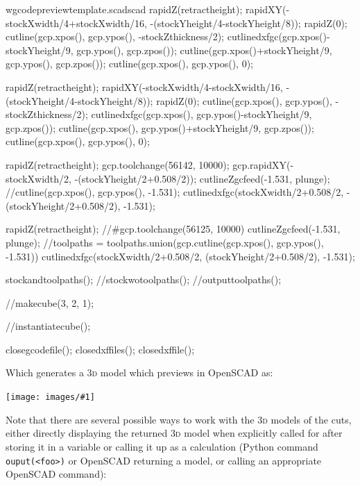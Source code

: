 \documentclass{ltxdoc}
\newcommand{\includeimage}[1]{\bigskip\noindent\texttt{[image: images/\#1]}\bigskip}
\begin{document}
\begin{writecode}{w}{gcodepreviewtemplate.scad}{scad}
rapidZ(retractheight);
rapidXY(-stockXwidth/4+stockXwidth/16, -(stockYheight/4-stockYheight/8));
rapidZ(0);
cutline(gcp.xpos(), gcp.ypos(), -stockZthickness/2);
cutlinedxfgc(gcp.xpos()-stockYheight/9, gcp.ypos(), gcp.zpos());
cutline(gcp.xpos()+stockYheight/9, gcp.ypos(), gcp.zpos());
cutline(gcp.xpos(), gcp.ypos(), 0);

rapidZ(retractheight);
rapidXY(-stockXwidth/4-stockXwidth/16, -(stockYheight/4-stockYheight/8));
rapidZ(0);
cutline(gcp.xpos(), gcp.ypos(), -stockZthickness/2);
cutlinedxfgc(gcp.xpos(), gcp.ypos()-stockYheight/9, gcp.zpos());
cutline(gcp.xpos(), gcp.ypos()+stockYheight/9, gcp.zpos());
cutline(gcp.xpos(), gcp.ypos(), 0);



rapidZ(retractheight);
gcp.toolchange(56142, 10000);
gcp.rapidXY(-stockXwidth/2, -(stockYheight/2+0.508/2));
cutlineZgcfeed(-1.531, plunge);
//cutline(gcp.xpos(), gcp.ypos(), -1.531);
cutlinedxfgc(stockXwidth/2+0.508/2, -(stockYheight/2+0.508/2), -1.531);

rapidZ(retractheight);
//#gcp.toolchange(56125, 10000)
cutlineZgcfeed(-1.531, plunge);
//toolpaths = toolpaths.union(gcp.cutline(gcp.xpos(), gcp.ypos(), -1.531))
cutlinedxfgc(stockXwidth/2+0.508/2, (stockYheight/2+0.508/2), -1.531);

stockandtoolpaths();
//stockwotoolpaths();
//outputtoolpaths();

//makecube(3, 2, 1);

//instantiatecube();

closegcodefile();
closedxffiles();
closedxffile();

\end{writecode}
\addtocounter{gcptmpl}{273}

\begin{samepage}
\noindent Which generates a \textsc{3d} model which previews in OpenSCAD as:

\bigskip

\includeimage{gcodepreview_unittests_scad.png}
\end{samepage}

Note that there are several possible ways to work with the \textsc{3d} models of the cuts, either directly displaying the returned \textsc{3d} model when explicitly called for after storing it in a variable or calling it up as a calculation (Python command \verb|ouput(<foo>)| or OpenSCAD returning a model, or calling an appropriate OpenSCAD command):
\end{document}
